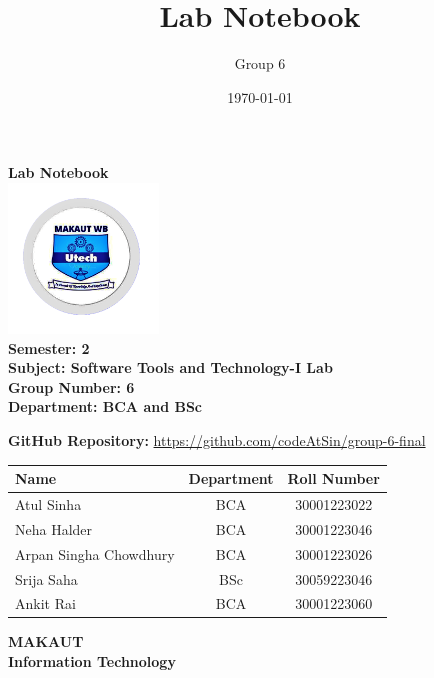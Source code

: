 \documentclass[a4paper,12pt]{article}
\title{Lab Notebook}
\author{Group 6}
\date{\today}
\begin{document}
\begin{titlepage}
    \centering
    \vspace*{0.5in}
    
    {\Huge\bfseries Lab Notebook \\[0.2cm]}
    \includegraphics[width=0.3\textwidth]{university_logo.png} \\[1.1cm]
    
    {\Large\bfseries Semester: 2 \\[0.5cm]}
    {\Large\bfseries Subject: Software Tools and Technology-I Lab \\[0.5cm]}
    {\Large\bfseries Group Number: 6 \\[0.5cm]}
    {\Large\bfseries Department: BCA and BSc \\[0.5cm]}
    
    {\Large \textbf{GitHub Repository:} \href{https://github.com/codeAtSin/group-6-final}{https://github.com/codeAtSin/group-6-final} \\[2cm]}
    
    \begin{tabular}{| l | c | c |}
        \hline
        \textbf{Name} & \textbf{Department} & \textbf{Roll Number} \\
        \hline
        Atul Sinha & BCA & 30001223022 \\
        \hline
        Neha Halder & BCA & 30001223046 \\
        \hline
        Arpan Singha Chowdhury & BCA & 30001223026 \\
        \hline
        Srija Saha & BSc & 30059223046 \\
        \hline
        Ankit Rai & BCA & 30001223060 \\
        \hline
    \end{tabular}

    \vfill

    {\large\bfseries MAKAUT \\ Information Technology}
\end{titlepage}

\newpage
\end{document}
